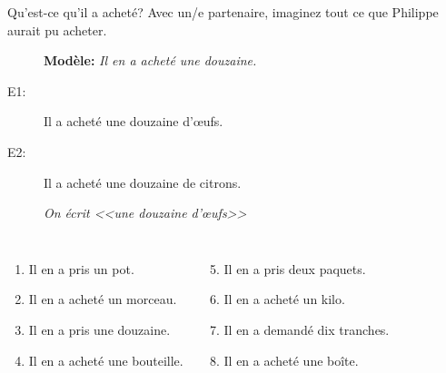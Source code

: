 \begin{frame}{Qu'est-ce qu'il a acheté?}
  Avec un/e partenaire, imaginez tout ce que Philippe aurait pu acheter.\\
  \begin{description}
    \item[] \textbf{Modèle:} \emph{Il en a acheté une douzaine.}
    \item[E1:] Il a acheté une douzaine d'œufs.
    \item[E2:] Il a acheté une douzaine de citrons.
    \item[] \emph{On écrit <<une douzaine d'œufs>>}
  \end{description}
  \begin{columns}
      \begin{enumerate}
        \item Il en a pris un pot.
        \item Il en a acheté un morceau.
        \item Il en a pris une douzaine.
        \item Il en a acheté une bouteille.
      \end{enumerate}
      \begin{enumerate}
        \setcounter{enumi}{4}
        \item Il en a pris deux paquets.
        \item Il en a acheté un kilo.
        \item Il en a demandé dix tranches.
        \item Il en a acheté une boîte.
      \end{enumerate}
  \end{columns}
\end{frame}